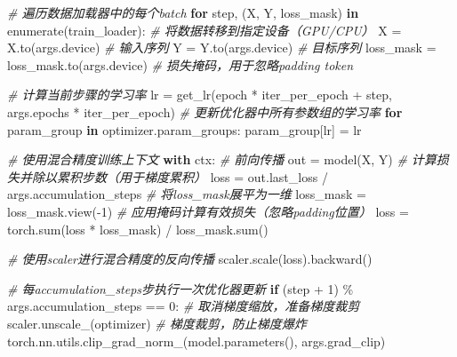 \documentclass[
]{article}
\newenvironment{Shaded}{}{}
\newcommand{\BuiltInTok}[1]{\textcolor[rgb]{0.00,0.50,0.00}{#1}}
\newcommand{\CommentTok}[1]{\textcolor[rgb]{0.38,0.63,0.69}{\textit{#1}}}
\newcommand{\ControlFlowTok}[1]{\textcolor[rgb]{0.00,0.44,0.13}{\textbf{#1}}}
\newcommand{\DecValTok}[1]{\textcolor[rgb]{0.25,0.63,0.44}{#1}}
\newcommand{\KeywordTok}[1]{\textcolor[rgb]{0.00,0.44,0.13}{\textbf{#1}}}
\newcommand{\NormalTok}[1]{#1}
\newcommand{\OperatorTok}[1]{\textcolor[rgb]{0.40,0.40,0.40}{#1}}
\newcommand{\StringTok}[1]{\textcolor[rgb]{0.25,0.44,0.63}{#1}}
\begin{document}
\begin{Shaded}
\begin{Highlighting}[]
    \CommentTok{\# 遍历数据加载器中的每个batch}
    \ControlFlowTok{for}\NormalTok{ step, (X, Y, loss\_mask) }\KeywordTok{in} \BuiltInTok{enumerate}\NormalTok{(train\_loader):}
        \CommentTok{\# 将数据转移到指定设备（GPU/CPU）}
\NormalTok{        X }\OperatorTok{=}\NormalTok{ X.to(args.device)  }\CommentTok{\# 输入序列}
\NormalTok{        Y }\OperatorTok{=}\NormalTok{ Y.to(args.device)  }\CommentTok{\# 目标序列}
\NormalTok{        loss\_mask }\OperatorTok{=}\NormalTok{ loss\_mask.to(args.device)  }\CommentTok{\# 损失掩码，用于忽略padding token}

        \CommentTok{\# 计算当前步骤的学习率}
\NormalTok{        lr }\OperatorTok{=}\NormalTok{ get\_lr(epoch }\OperatorTok{*}\NormalTok{ iter\_per\_epoch }\OperatorTok{+}\NormalTok{ step, args.epochs }\OperatorTok{*}\NormalTok{ iter\_per\_epoch)}
        \CommentTok{\# 更新优化器中所有参数组的学习率}
        \ControlFlowTok{for}\NormalTok{ param\_group }\KeywordTok{in}\NormalTok{ optimizer.param\_groups:}
\NormalTok{            param\_group[}\StringTok{\textquotesingle{}lr\textquotesingle{}}\NormalTok{] }\OperatorTok{=}\NormalTok{ lr}

        \CommentTok{\# 使用混合精度训练上下文}
        \ControlFlowTok{with}\NormalTok{ ctx:}
            \CommentTok{\# 前向传播}
\NormalTok{            out }\OperatorTok{=}\NormalTok{ model(X, Y)}
            \CommentTok{\# 计算损失并除以累积步数（用于梯度累积）}
\NormalTok{            loss }\OperatorTok{=}\NormalTok{ out.last\_loss }\OperatorTok{/}\NormalTok{ args.accumulation\_steps}
            \CommentTok{\# 将loss\_mask展平为一维}
\NormalTok{            loss\_mask }\OperatorTok{=}\NormalTok{ loss\_mask.view(}\OperatorTok{{-}}\DecValTok{1}\NormalTok{)}
            \CommentTok{\# 应用掩码计算有效损失（忽略padding位置）}
\NormalTok{            loss }\OperatorTok{=}\NormalTok{ torch.}\BuiltInTok{sum}\NormalTok{(loss }\OperatorTok{*}\NormalTok{ loss\_mask) }\OperatorTok{/}\NormalTok{ loss\_mask.}\BuiltInTok{sum}\NormalTok{()}

        \CommentTok{\# 使用scaler进行混合精度的反向传播}
\NormalTok{        scaler.scale(loss).backward()}

        \CommentTok{\# 每accumulation\_steps步执行一次优化器更新}
        \ControlFlowTok{if}\NormalTok{ (step }\OperatorTok{+} \DecValTok{1}\NormalTok{) }\OperatorTok{\%}\NormalTok{ args.accumulation\_steps }\OperatorTok{==} \DecValTok{0}\NormalTok{:}
            \CommentTok{\# 取消梯度缩放，准备梯度裁剪}
\NormalTok{            scaler.unscale\_(optimizer)}
            \CommentTok{\# 梯度裁剪，防止梯度爆炸}
\NormalTok{            torch.nn.utils.clip\_grad\_norm\_(model.parameters(), args.grad\_clip)}


\end{Highlighting}
\end{Shaded}
\end{document}
